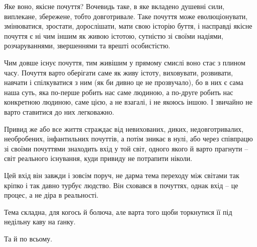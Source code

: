 Яке воно, якісне почуття? Вочевидь таке, в яке вкладено душевні сили,
виплекане, збережене, тобто довготривале. Таке почуття може еволюціонувати,
змінюватися, зростати, дорослішати, мати свою історію буття, і насправді якісне
почуття є ні чим іншим як живою істотою, сутністю зі своїми надіями,
розчаруваннями, звершеннями та врешті особистістю. 

Чим довше існує почуття, тим живішим у прямому смислі воно стає з плином часу.
Почуття варто оберігати саме як живу істоту, виховувати, розвивати, навчати і
спілкуватися з ним (як би дивно це не прозвучало), бо в них є сама наша суть,
яка по-перше робить нас саме людиною, а по-друге робить нас конкретною людиною,
саме цією, а не взагалі, і не якоюсь іншою. І звичайно не варто ставитися до
них легковажно.

Привид же або все життя страждає від невихованих, диких, недовготривалих,
необробених, інфантильних почуттів, а потім зникає в нулі, або через співпрацю
зі своїми почуттями знаходить вхід у той світ, одного якого й варто прагнути –
світ реального існування, куди привиду не потрапити ніколи.

Цей вхід він завжди і зовсім поруч, не дарма тема переходу між світами так
кріпко і так давно турбує людство. Він сховався в почуттях, однак вхід – це
процес, а не діра в реальності.

Тема складна, для когось й болюча, але варта того щоби торкнутися її під
недільну каву на ґанку.

Та й по всьому.
